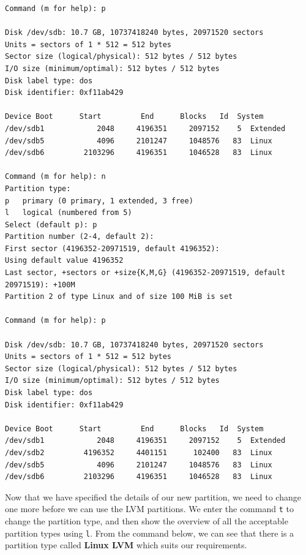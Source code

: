 \begin{verbatim}
Command (m for help): p

Disk /dev/sdb: 10.7 GB, 10737418240 bytes, 20971520 sectors
Units = sectors of 1 * 512 = 512 bytes
Sector size (logical/physical): 512 bytes / 512 bytes
I/O size (minimum/optimal): 512 bytes / 512 bytes
Disk label type: dos
Disk identifier: 0xf11ab429

Device Boot      Start         End      Blocks   Id  System
/dev/sdb1            2048     4196351     2097152    5  Extended
/dev/sdb5            4096     2101247     1048576   83  Linux
/dev/sdb6         2103296     4196351     1046528   83  Linux

Command (m for help): n
Partition type:
p   primary (0 primary, 1 extended, 3 free)
l   logical (numbered from 5)
Select (default p): p
Partition number (2-4, default 2): 
First sector (4196352-20971519, default 4196352): 
Using default value 4196352
Last sector, +sectors or +size{K,M,G} (4196352-20971519, default 20971519): +100M 
Partition 2 of type Linux and of size 100 MiB is set

Command (m for help): p

Disk /dev/sdb: 10.7 GB, 10737418240 bytes, 20971520 sectors
Units = sectors of 1 * 512 = 512 bytes
Sector size (logical/physical): 512 bytes / 512 bytes
I/O size (minimum/optimal): 512 bytes / 512 bytes
Disk label type: dos
Disk identifier: 0xf11ab429

Device Boot      Start         End      Blocks   Id  System
/dev/sdb1            2048     4196351     2097152    5  Extended
/dev/sdb2         4196352     4401151      102400   83  Linux
/dev/sdb5            4096     2101247     1048576   83  Linux
/dev/sdb6         2103296     4196351     1046528   83  Linux
\end{verbatim}
\vspace{-10pt}

\noindent
Now that we have specified the details of our new partition, we need to change one more before we can use the LVM partitions. We enter the command \verb|t| to change the partition type, and then show the overview of all the acceptable partition types using \verb|l|. From the command below, we can see that there is a partition type called \textbf{Linux LVM} which suits our requirements. 

